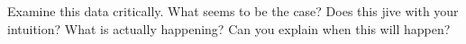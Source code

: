 \begin{prob}
Examine this data critically. What seems to be the case? Does this
jive with your intuition? What is actually happening? Can you explain
when this will happen?
\end{prob}











